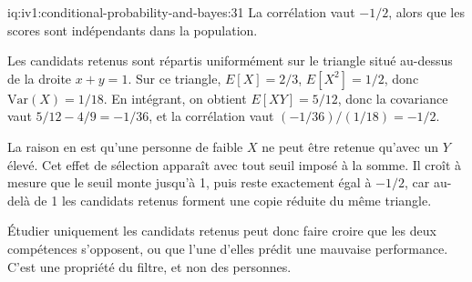 \begin{solution}{iq:iv1:conditional-probability-and-bayes:31}
La corrélation vaut $-1/2$, alors que les scores sont indépendants dans la population.

Les candidats retenus sont répartis uniformément sur le triangle situé au-dessus de la droite $x + y = 1$. Sur ce triangle, $E[X] = 2/3$, $E[X^2] = 1/2$, donc $\mathrm{Var}(X) = 1/18$. En intégrant, on obtient $E[XY] = 5/12$, donc la covariance vaut $5/12 - 4/9 = -1/36$, et la corrélation vaut $(-1/36)/(1/18) = -1/2$.

La raison en est qu'une personne de faible $X$ ne peut être retenue qu'avec un $Y$ élevé. Cet effet de sélection apparaît avec tout seuil imposé à la somme. Il croît à mesure que le seuil monte jusqu'à 1, puis reste exactement égal à $-1/2$, car au-delà de 1 les candidats retenus forment une copie réduite du même triangle.

Étudier uniquement les candidats retenus peut donc faire croire que les deux compétences s'opposent, ou que l'une d'elles prédit une mauvaise performance. C'est une propriété du filtre, et non des personnes.

\end{solution}

